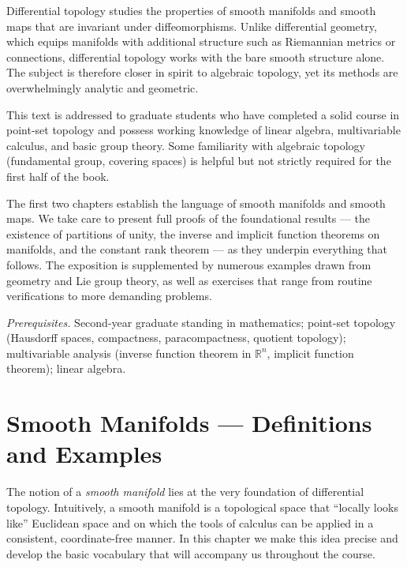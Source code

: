 \documentclass[12pt,a4paper,openany]{book}
\theoremstyle{definition}
\theoremstyle{remark}
\newcommand{\R}{\mathbb{R}}
\begin{document}
Differential topology studies the properties of smooth manifolds and smooth
maps that are invariant under diffeomorphisms.  Unlike differential geometry,
which equips manifolds with additional structure such as Riemannian metrics
or connections, differential topology works with the bare smooth structure
alone.  The subject is therefore closer in spirit to algebraic topology, yet
its methods are overwhelmingly analytic and geometric.

This text is addressed to graduate students who have completed a solid course
in point-set topology and possess working knowledge of linear algebra,
multivariable calculus, and basic group theory.  Some familiarity with
algebraic topology (fundamental group, covering spaces) is helpful but not
strictly required for the first half of the book.

The first two chapters establish the language of smooth manifolds and smooth
maps.  We take care to present full proofs of the foundational results ---
the existence of partitions of unity, the inverse and implicit function
theorems on manifolds, and the constant rank theorem --- as they underpin
everything that follows.  The exposition is supplemented by numerous examples
drawn from geometry and Lie group theory, as well as exercises that range
from routine verifications to more demanding problems.

\medskip
\noindent\textit{Prerequisites.}\enspace
Second-year graduate standing in mathematics; point-set topology
(Hausdorff spaces, compactness, paracompactness, quotient topology);
multivariable analysis (inverse function theorem in $\R^n$,
implicit function theorem); linear algebra.

%
%

\chapter{Smooth Manifolds --- Definitions and Examples}
\label{ch:smooth-manifolds}
\minitoc
\bigskip

\noindent
The notion of a \emph{smooth manifold} lies at the
very foundation of differential topology.  Intuitively, a smooth manifold
is a topological space that ``locally looks like'' Euclidean space and on
which the tools of calculus can be applied in a consistent, coordinate-free
manner.  In this chapter we make this idea precise and develop the basic
vocabulary that will accompany us throughout the course.
\end{document}
